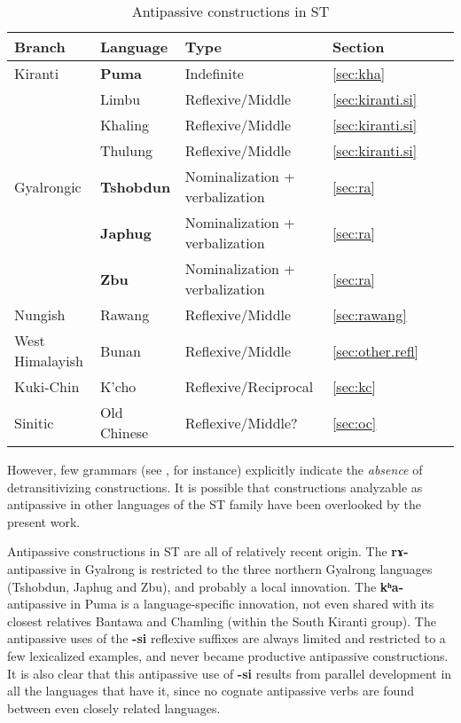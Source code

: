\documentclass[oneside,a4paper,11pt]{article}
\newcommand{\ipa}[1]{{\phon\textbf{#1}}}
\begin{document}
\begin{table}[h]
\caption{Antipassive constructions in ST} \label{tab:summary} \centering
\begin{tabular}{llllll}
\toprule
Branch & Language & Type & Section \\
\midrule
Kiranti & \textbf{Puma} & Indefinite & \ref{sec:kha} \\
&Limbu & Reflexive/Middle & \ref{sec:kiranti.si} \\
&Khaling & Reflexive/Middle & \ref{sec:kiranti.si} \\
&Thulung & Reflexive/Middle & \ref{sec:kiranti.si} \\
Gyalrongic & \textbf{Tshobdun} & Nominalization + verbalization & \ref{sec:ra} \\
  & \textbf{Japhug} & Nominalization + verbalization&  \ref{sec:ra}   \\
  & \textbf{Zbu} & Nominalization + verbalization&  \ref{sec:ra}   \\
  Nungish & Rawang & Reflexive/Middle & \ref{sec:rawang} \\
  West Himalayish & Bunan & Reflexive/Middle  & \ref{sec:other.refl} \\
Kuki-Chin & K'cho  & Reflexive/Reciprocal &\ref{sec:kc}\\
Sinitic & Old Chinese  & Reflexive/Middle? & \ref{sec:oc} \\
\bottomrule
\end{tabular}
\end{table} 

However, few grammars (see \citealt[83]{tournadre96erg}, \citealt[108]{genetti07grammar} for instance) explicitly indicate the \textit{absence} of detransitivizing constructions. It is possible that constructions analyzable as antipassive in other languages of the ST family have been overlooked by the present work.%

Antipassive constructions in ST are all of relatively recent origin. The \ipa{rɤ-} antipassive in Gyalrong is restricted to the three northern Gyalrong languages (Tshobdun, Japhug and Zbu), and probably a local innovation. The \ipa{kʰa-} antipassive in Puma is a language-specific innovation, not even shared with its closest relatives Bantawa and Chamling (within the South Kiranti group). The antipassive uses of the \ipa{-si} reflexive suffixes are always limited and restricted to a few lexicalized examples, and never became productive antipassive constructions. It is also clear that this antipassive use of \ipa{-si} results from parallel development in all the languages that have it, since no cognate antipassive verbs are found between even closely related languages.
\end{document}
